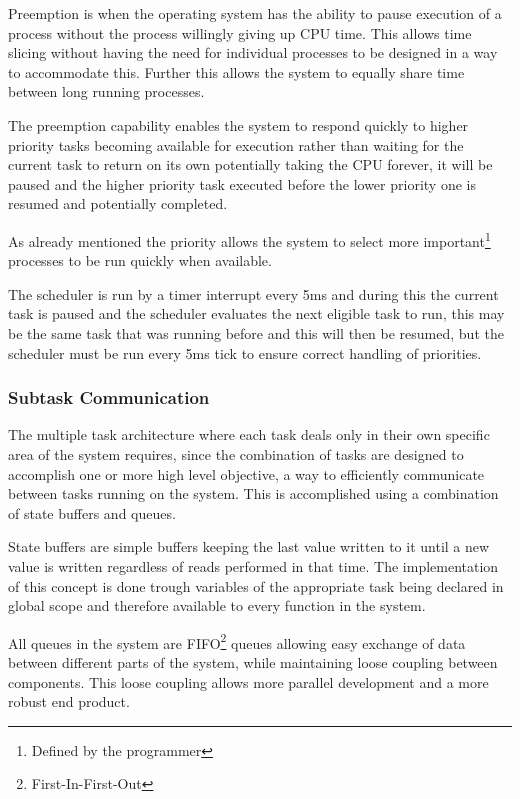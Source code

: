 \documentclass[../../../main]{subfiles}
\begin{document}
Preemption is when the operating system has the ability to pause execution of a process without the process willingly giving up CPU time. This allows time slicing without having the need for individual processes to be designed in a way to accommodate this. Further this allows the system to equally share time between long running processes.

The preemption capability enables the system to respond quickly to higher priority tasks becoming available for execution rather than waiting for the current task to return on its own potentially taking the CPU forever, it will be paused and the higher priority task executed before the lower priority one is resumed and potentially completed. 

As already mentioned the priority allows the system to select more important\footnote{Defined by the programmer} processes to be run quickly when available.

The scheduler is run by a timer interrupt every 5ms and during this the current task is paused and the scheduler evaluates the next eligible task to run, this may be the same task that was running before and this will then be resumed, but the scheduler must be run every 5ms tick to ensure correct handling of priorities.

\subsubsection{Subtask Communication}

The multiple task architecture where each task deals only in their own specific area of the system requires, since the combination of tasks are designed to accomplish one or more high level objective, a way to efficiently communicate between tasks running on the system.
This is accomplished using a combination of state buffers and queues.

State buffers are simple buffers keeping the last value written to it until a new value is written regardless of reads performed in that time. The implementation of this concept is done trough variables of the appropriate task being declared in global scope and therefore available to every function in the system.

All queues in the system are FIFO\footnote{First-In-First-Out} queues allowing easy exchange of data between different parts of the system, while maintaining loose coupling between components. This loose coupling allows more parallel development and a more robust end product.
\end{document}
